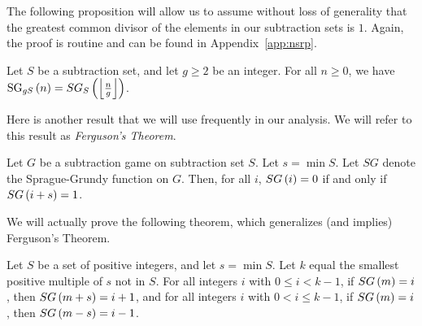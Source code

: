 \documentclass[english,12pt]{article}
\DeclareMathOperator{\SG}{SG}
\begin{document}
The following proposition will allow us to assume without loss of generality that the greatest common divisor of the elements in our subtraction sets is $1$.  Again, the proof is routine and can be found in Appendix~\ref{app:nsrp}.
\begin{prop}\label{prop:gcd}
Let $S$ be a subtraction set, and let $g\geq2$ be an integer. For all $n\geq0$, we have $\SG_{gS}\p{n}=SG_S\p{\fl{\frac{n}{g}}}$.
\end{prop}

Here is another result that we will use frequently in our analysis.  We will refer to this result as \emph{Ferguson's Theorem}.
\begin{theorem}[Ferguson]\cite{bcg}\label{thm:ferguson}
Let $G$ be a subtraction game on subtraction set $S$.  Let $s=\min S$.  Let $SG$ denote the Sprague-Grundy function on $G$.  Then, for all $i$, $SG\left(i\right)=0$ if and only if $SG\left(i+s\right)=1$.
\end{theorem}
We will actually prove the following theorem, which generalizes (and implies) Ferguson's Theorem.
\begin{theorem}\label{thm:genferguson}
Let $S$ be a set of positive integers, and let $s=\min S$.  Let $k$ equal the smallest positive multiple of $s$ not in $S$.  For all integers $i$ with $0\leq i<k-1$, if $SG\left(m\right)=i$, then $SG\left(m+s\right)=i+1$, and for all integers $i$ with $0<i\leq k-1$, if $SG\left(m\right)=i$, then $SG\left(m-s\right)=i-1$.
\end{theorem}
\end{document}
